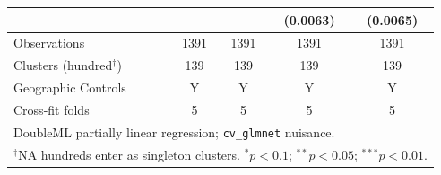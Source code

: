 \begin{table}[H]
\begin{tabular}{lcccc}
 &  &  & (0.0063) & (0.0065) \\
\hline
Observations & 1391 & 1391 & 1391 & 1391 \\
Clusters (hundred$^\dagger$) & 139 & 139 & 139 & 139 \\
Geographic Controls & Y & Y & Y & Y \\
Cross-fit folds & 5 & 5 & 5 & 5 \\
\hline\hline
\multicolumn{5}{l}{\footnotesize DoubleML partially linear regression; \texttt{cv\_glmnet} nuisance.} \\
\multicolumn{5}{l}{\footnotesize $^\dagger$NA hundreds enter as singleton clusters. $^{*}p<0.1$; $^{**}p<0.05$; $^{***}p<0.01$.} \\
\end{tabular}
\end{table}
